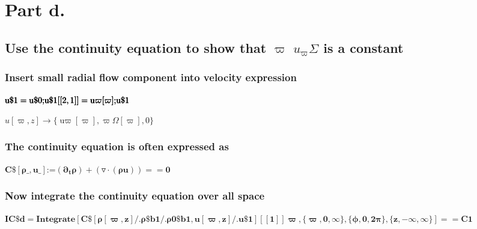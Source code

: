 \documentclass{article}
\begin{document}
\section*{Part d.}

\subsection*{Use the continuity equation to show that $\varpi $ \(u_{\varpi }\Sigma\) is a constant}

\subsubsection*{Insert small radial flow component into velocity expression}

\begin{doublespace}
\noindent\(\pmb{\text{u$\$$1} = \text{u$\$$0};}\\
\pmb{\text{u$\$$1}[[2,1]] = \text{u$\varpi $}[\varpi ];}\\
\pmb{\text{u$\$$1}}\)
\end{doublespace}

\begin{doublespace}
\noindent\(u[\varpi ,z]\to \{\text{u$\varpi $}[\varpi ],\varpi  \Omega [\varpi ],0\}\)
\end{doublespace}

\subsubsection*{The continuity equation is often expressed as}

\begin{doublespace}
\noindent\(\pmb{\text{C$\$$}[\rho \_,\text{u$\_$}]\text{:=} \left(\partial _t\rho \right)+ (\triangledown \cdot (\rho  u)) == 0}\)
\end{doublespace}

\subsubsection*{Now integrate the continuity equation over all space}

\begin{doublespace}
\noindent\(\pmb{\text{IC$\$$d} = \text{Integrate}[\text{C$\$$}[\rho [\varpi ,z]\text{/.}\text{$\rho \$$b1}\text{/.}\text{$\rho $0$\$$b1} ,u[\varpi
,z] \text{/.} \text{u$\$$1}][[1]] \varpi ,\{\varpi ,0,\infty \},\{\phi ,0,2\pi \},\{z,-\infty , \infty \}] == \text{C1}}\)
\end{doublespace}
\end{document}
